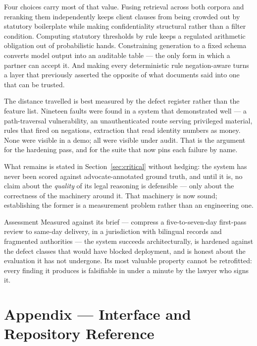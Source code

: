 \documentclass[11pt,a4paper]{article}
\begin{document}
Four choices carry most of that value. Fusing retrieval across both corpora and reranking
them independently keeps client clauses from being crowded out by statutory boilerplate
while making confidentiality structural rather than a filter condition. Computing statutory
thresholds by rule keeps a regulated arithmetic obligation out of probabilistic hands.
Constraining generation to a fixed schema converts model output into an auditable table ---
the only form in which a partner can accept it. And making every deterministic rule
negation-aware turns a layer that previously asserted the opposite of what documents said
into one that can be trusted.

The distance travelled is best measured by the defect register rather than the feature
list. Nineteen faults were found in a system that demonstrated well --- a path-traversal
vulnerability, an unauthenticated route serving privileged material, rules that fired on
negations, extraction that read identity numbers as money. None were visible in a demo; all
were visible under audit. That is the argument for the hardening pass, and for the suite
that now pins each failure by name.

What remains is stated in Section~\ref{sec:critical} without hedging: the system has never
been scored against advocate-annotated ground truth, and until it is, no claim about the
\emph{quality} of its legal reasoning is defensible --- only about the correctness of the
machinery around it. That machinery is now sound; establishing the former is a measurement
problem rather than an engineering one.

\vspace{6pt}
\begin{winbox}{Assessment}
\small
Measured against its brief --- compress a five-to-seven-day first-pass review to same-day
delivery, in a jurisdiction with bilingual records and fragmented authorities --- the system
succeeds architecturally, is hardened against the defect classes that would have blocked
deployment, and is honest about the evaluation it has not undergone. Its most valuable
property cannot be retrofitted: every finding it produces is falsifiable in under a minute
by the lawyer who signs it.
\end{winbox}

\appendix
\section{Appendix --- Interface and Repository Reference}
\end{document}
